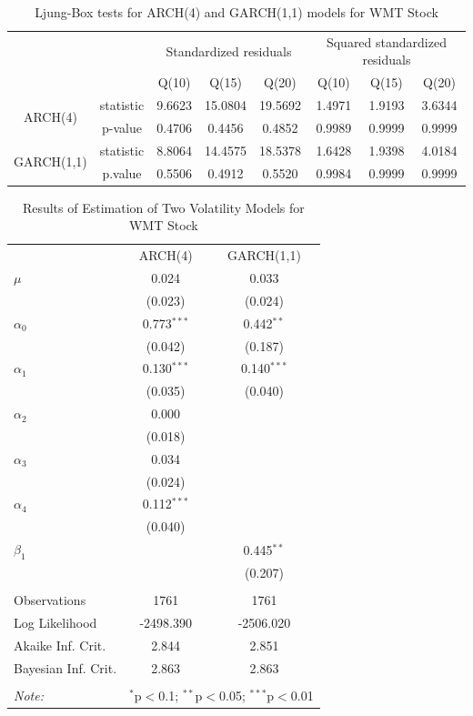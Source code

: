 \documentclass[paper=a4, fontsize=11pt]{article}
\begin{document}
\begin{table}[!htbp] \centering 
  \caption{Ljung-Box tests for ARCH(4) and GARCH(1,1) models for WMT Stock} 
  \label{lb_WMT} 
\begin{tabular}{cc|cccccc} 
\\[-1.8ex]\hline 
\hline
& & \multicolumn{3}{c}{Standardized residuals} & \multicolumn{3}{c}{Squared standardized residuals} \\
& & Q(10) & Q(15) & Q(20) & Q(10) & Q(15) & Q(20) \\
\hline 
\multirow{2}{*}{ARCH(4)} & statistic & 9.6623 & 15.0804 & 19.5692 & 1.4971 & 1.9193 & 3.6344 \\
& p-value & 0.4706 & 0.4456 & 0.4852 & 0.9989 & 0.9999 & 0.9999 \\
\multirow{2}{*}{GARCH(1,1)} & statistic & 8.8064 & 14.4575 & 18.5378 & 1.6428 & 1.9398 & 4.0184 \\
& p.value & 0.5506 & 0.4912 & 0.5520 & 0.9984 & 0.9999 & 0.9999 \\
\hline
\hline 
\end{tabular} 
\end{table} 

\begin{table}[!htbp] \centering 
  \caption{Results of Estimation of Two Volatility Models for WMT Stock} 
  \label{est_WMT} 
\begin{tabular}{@{\extracolsep{5pt}}lcc} 
\\[-1.8ex]\hline 
\hline
 & ARCH(4) & GARCH(1,1) \\ 
  $\mu$ & 0.024 & 0.033 \\ 
  & (0.023) & (0.024) \\ 
 $\alpha_0$ & 0.773$^{***}$ & 0.442$^{**}$ \\ 
  & (0.042) & (0.187) \\ 
 $\alpha_1$ & 0.130$^{***}$ & 0.140$^{***}$ \\ 
  & (0.035) & (0.040) \\ 
 $\alpha_2$ & 0.000 &  \\ 
  & (0.018) &  \\ 
 $\alpha_3$ & 0.034 &  \\ 
  & (0.024) &  \\ 
 $\alpha_4$ & 0.112$^{***}$ &  \\ 
  & (0.040) &  \\ 
 $\beta_1$ &  & 0.445$^{**}$ \\ 
  &  & (0.207) \\ 
\hline \\[-1.8ex] 
Observations & 1761 & 1761 \\ 
Log Likelihood & -2498.390 & -2506.020 \\ 
Akaike Inf. Crit. & 2.844 & 2.851 \\ 
Bayesian Inf. Crit. & 2.863 & 2.863 \\ 
\hline 
\hline \\[-1.8ex] 
\textit{Note:}  & \multicolumn{2}{r}{$^{*}$p$<$0.1; $^{**}$p$<$0.05; $^{***}$p$<$0.01} \\ 
\end{tabular} 
\end{table} 
\end{document}
